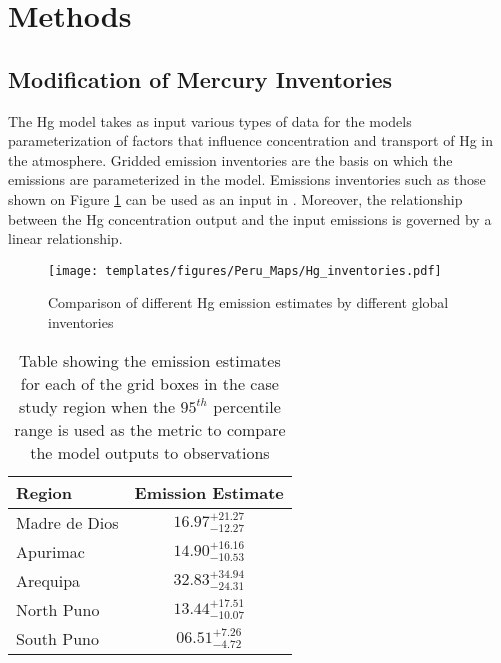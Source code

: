 \section{Methods}

\subsection{Modification of Mercury Inventories}
\begin{flushleft}
The \gc Hg model takes as input various types of data for the models parameterization of factors that influence concentration and transport of Hg in the atmosphere. Gridded emission inventories are the basis on which the emissions are parameterized in the model. Emissions inventories such as those shown on Figure \ref{fig:Hg_inventories} can be used as an input in \gc. Moreover, the relationship between the Hg concentration output and the input emissions is governed by a linear relationship. 
\end{flushleft}
\begin{figure}[H]
  \texttt{[image: templates/figures/Peru\_Maps/Hg\_inventories.pdf]}
  \centering
  \caption{Comparison of different Hg emission estimates by different global inventories}
  \label{fig:Hg_inventories}
  
\end{figure}
\FloatBarrier
\begin{table}[H]
\caption{Table showing the emission estimates for each of the grid boxes in the case study region when the $95^{th}$ percentile range is used as the metric to compare the model outputs to observations}
    \label{tab:MCMC_estimates}
\begin{tabular}{lc}

\textbf{Region}        & \textbf{Emission Estimate}                             \\
\hline
Madre de Dios & $16.97^{+21.27}_{-12.27}$ \\

Apurimac      & $14.90^{+16.16}_{-10.53}$\\

Arequipa      & $32.83^{+34.94}_{-24.31}$ \\

North Puno    & $13.44^{+17.51}_{-10.07}$ \\

South Puno    & $06.51^{+7.26}_{-4.72}$ \\
\hline
\end{tabular}
\centering
\end{table}

